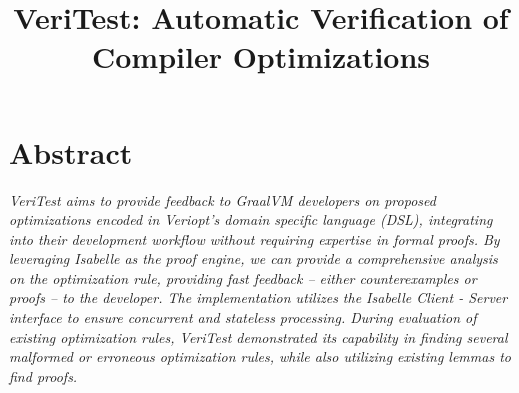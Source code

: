 \documentclass[conference,a4paper,english,10pt]{IEEEtran}[2015/08/26]
\begin{document}

\title{\Large \textbf{VeriTest: Automatic Verification of Compiler Optimizations}}

\begin{large}
\author{%
}
\end{large}


\maketitle

%
%
\iffalse
  \IEEEoverridecommandlockouts
  \IEEEpubid{\begin{minipage}{\textwidth}\ \\[12pt] \centering
      1551-3203 \copyright 2015 IEEE.
      Personal use is permitted, but republication/redistribution requires IEEE permission.
      \\
      See \url{https://www.ieee.org/publications_standards/publications/rights/index.html} for more information.
    \end{minipage}}
\fi

\section*{\centering \textbf{Abstract}}
\begin{sublargesize}
  \textit{
    VeriTest aims to provide feedback to GraalVM developers on proposed optimizations encoded in Veriopt's domain specific language (DSL),
    integrating into their development workflow without requiring expertise in formal proofs. By leveraging Isabelle as the proof engine, 
    we can provide a comprehensive analysis on the optimization rule, providing fast feedback -- either counterexamples or proofs -- to the developer. 
    The implementation utilizes the Isabelle Client - Server interface to ensure concurrent and stateless processing.
    During evaluation of existing optimization rules, VeriTest demonstrated its capability in finding several malformed or erroneous optimization 
    rules, while also utilizing existing lemmas to find proofs.
  }
\end{sublargesize}
\end{document}
